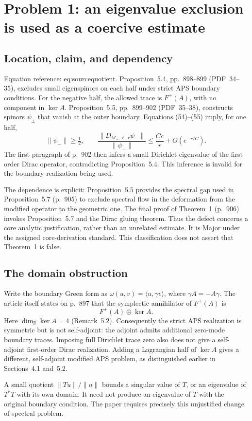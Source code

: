 \documentclass[10pt]{article}
\begin{document}
\section*{Problem 1: an eigenvalue exclusion is used as a coercive estimate}
\subsection*{Location, claim, and dependency}
Equation reference: eq:sourcequotient. Proposition 5.4, pp. 898–899 (PDF 34–35), excludes small eigenspinors on each half under strict APS boundary conditions. For the negative half, the allowed trace is \(F^+(A)\), with no component in \(\ker A\). Proposition 5.5, pp. 899–902 (PDF 35–38), constructs spinors \(\psi_\pm\) that vanish at the outer boundary. Equations (54)–(55) imply, for one half, \[
 \|\psi_-\|\geq\tfrac12,\qquad
 \frac{\|D_{M_-,\ell,r}\psi_-\|}{\|\psi_-\|}
 \leq \frac{C c}{r}+O(e^{-r/C}).\] The first paragraph of p. 902 then infers a small Dirichlet eigenvalue of the first-order Dirac operator, contradicting Proposition 5.4. This inference is invalid for the boundary realization being used.\par
The dependence is explicit: Proposition 5.5 provides the spectral gap used in Proposition 5.7 (p. 905) to exclude spectral flow in the deformation from the modified operator to the geometric one. The final proof of Theorem 1 (p. 906) invokes Proposition 5.7 and the Dirac gluing theorem. Thus the defect concerns a core analytic justification, rather than an unrelated estimate. It is Major under the assigned core-derivation standard. This classification does not assert that Theorem 1 is false.\par
\subsection*{The domain obstruction}
Write the boundary Green form as \(\omega(u,v)=\langle u,\gamma v\rangle\), where \(\gamma A=-A\gamma\). The article itself states on p. 897 that the symplectic annihilator of \(F^+(A)\) is \[F^+(A)\oplus\ker A.\] Here \(\dim_\mathbb R\ker A=4\) (Remark 5.2). Consequently the strict APS realization is symmetric but is not self-adjoint: the adjoint admits additional zero-mode boundary traces. Imposing full Dirichlet trace zero also does not give a self-adjoint first-order Dirac realization. Adding a Lagrangian half of \(\ker A\) gives a different, self-adjoint modified APS problem, as distinguished earlier in Sections 4.1 and 5.2.\par
A small quotient \(\|T u\|/\|u\|\) bounds a singular value of \(T\), or an eigenvalue of \(T^*T\) with its own domain. It need not produce an eigenvalue of \(T\) with the original boundary condition. The paper requires precisely this unjustified change of spectral problem.\par
\end{document}
